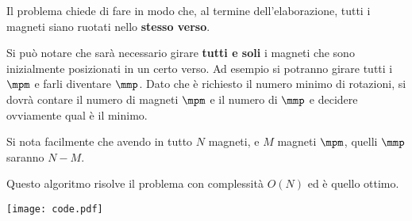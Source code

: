 

Il problema chiede di fare in modo che, al termine dell'elaborazione, tutti i magneti siano ruotati nello \textbf{stesso verso}.

\SolN

Si può notare che sarà necessario girare \textbf{tutti e soli} i magneti che sono inizialmente posizionati in un certo verso.\newline
Ad esempio si potranno girare tutti i $\mpm$ e farli diventare $\mmp$.\newline
Dato che è richiesto il numero minimo di rotazioni, si dovrà contare il numero di magneti $\mpm$ e il numero di $\mmp$ e decidere ovviamente qual è il minimo.

Si nota facilmente che avendo in tutto $N$ magneti, e $M$ magneti $\mpm$, quelli $\mmp$ saranno $N-M$.

Questo algoritmo risolve il problema con complessità $O(N)$ ed è quello ottimo.

\Codice

\texttt{[image: code.pdf]}